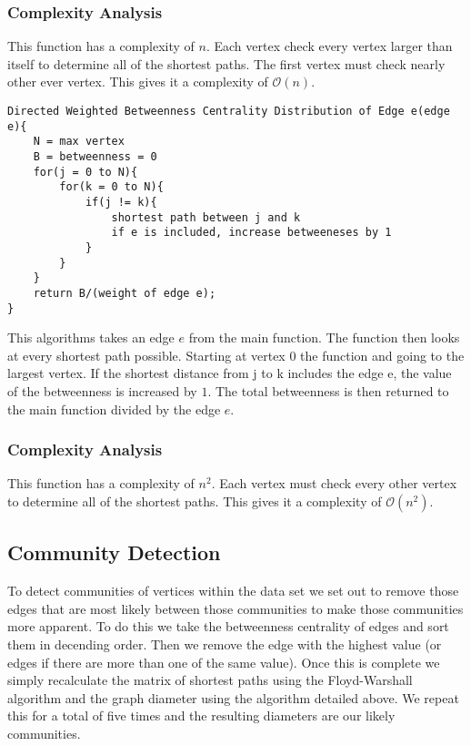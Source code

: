 \documentclass{article}
\begin{document}
\subsubsection{Complexity Analysis}
This function has a complexity of $n$. Each vertex check every vertex larger than itself to determine all of the shortest paths. The first vertex must check nearly other ever vertex. This gives it a complexity of $\mathcal{O}(n)$.

\begin{verbatim}
Directed Weighted Betweenness Centrality Distribution of Edge e(edge e){
    N = max vertex
    B = betweenness = 0
    for(j = 0 to N){
        for(k = 0 to N){
            if(j != k){
                shortest path between j and k
                if e is included, increase betweeneses by 1
            }
        }
    }
    return B/(weight of edge e);
}
\end{verbatim}

This algorithms takes an edge $e$ from the main function. The function then looks at every shortest path possible. Starting at vertex $0$ the function and going to the largest vertex. If the shortest distance from j to k includes the edge e, the value of the betweenness is increased by $1$. The total betweenness is then returned to the main function divided by the edge $e$.

\subsubsection{Complexity Analysis}
This function has a complexity of $n^2$. Each vertex must check every other vertex to determine all of the shortest paths. This gives it a complexity of $\mathcal{O}(n^2)$.

\subsection{Community Detection}
To detect communities of vertices within the data set we set out to remove those edges that are most likely between those communities to make those communities more apparent. To do this we take the betweenness centrality of edges and sort them in decending order. Then we remove the edge with the highest value (or edges if there are more than one of the same value). Once this is complete we simply recalculate the matrix of shortest paths using the Floyd-Warshall algorithm and the graph diameter using the algorithm detailed above. We repeat this for a total of five times and the resulting diameters are our likely communities.
\end{document}
